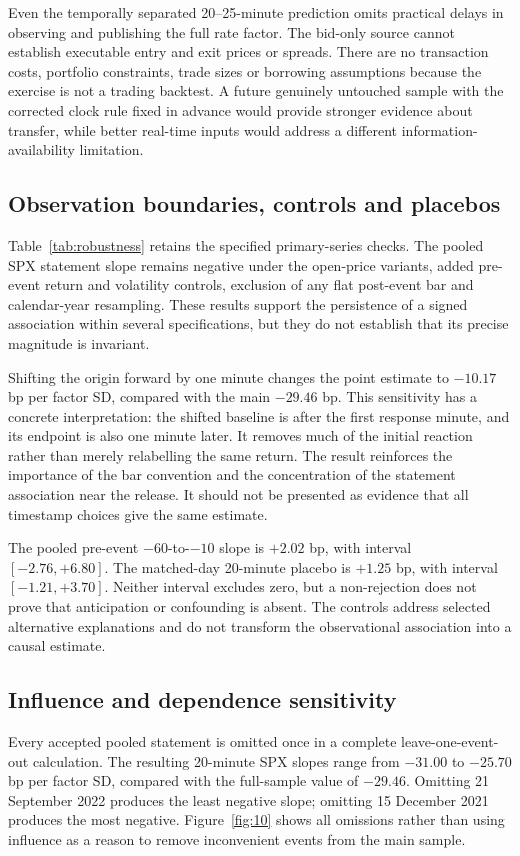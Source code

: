 
Even the temporally separated 20--25-minute prediction omits practical delays in observing and publishing the full rate factor. The bid-only source cannot establish executable entry and exit prices or spreads. There are no transaction costs, portfolio constraints, trade sizes or borrowing assumptions because the exercise is not a trading backtest. A future genuinely untouched sample with the corrected clock rule fixed in advance would provide stronger evidence about transfer, while better real-time inputs would address a different information-availability limitation.

\label{sec:robustness}
\subsection{Observation boundaries, controls and placebos}
Table~\ref{tab:robustness} retains the specified primary-series checks. The pooled SPX statement slope remains negative under the open-price variants, added pre-event return and volatility controls, exclusion of any flat post-event bar and calendar-year resampling. These results support the persistence of a signed association within several specifications, but they do not establish that its precise magnitude is invariant.


Shifting the origin forward by one minute changes the point estimate to $-10.17$ bp per factor SD, compared with the main $-29.46$ bp. This sensitivity has a concrete interpretation: the shifted baseline is after the first response minute, and its endpoint is also one minute later. It removes much of the initial reaction rather than merely relabelling the same return. The result reinforces the importance of the bar convention and the concentration of the statement association near the release. It should not be presented as evidence that all timestamp choices give the same estimate.

The pooled pre-event $-60$-to-$-10$ slope is $+2.02$ bp, with interval $[-2.76,+6.80]$. The matched-day 20-minute placebo is $+1.25$ bp, with interval $[-1.21,+3.70]$. Neither interval excludes zero, but a non-rejection does not prove that anticipation or confounding is absent. The controls address selected alternative explanations and do not transform the observational association into a causal estimate.

\subsection{Influence and dependence sensitivity}
Every accepted pooled statement is omitted once in a complete leave-one-event-out calculation. The resulting 20-minute SPX slopes range from $-31.00$ to $-25.70$ bp per factor SD, compared with the full-sample value of $-29.46$. Omitting 21 September 2022 produces the least negative slope; omitting 15 December 2021 produces the most negative. Figure~\ref{fig:10} shows all omissions rather than using influence as a reason to remove inconvenient events from the main sample.

